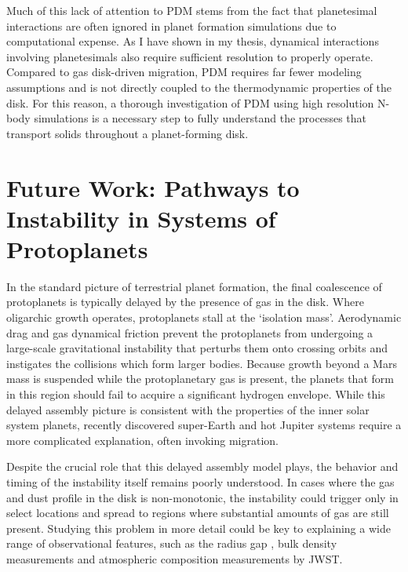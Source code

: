 Much of this lack of attention to PDM stems from the fact that planetesimal interactions are often ignored in planet formation simulations due to computational expense. As I have shown in my thesis, dynamical interactions involving planetesimals also require sufficient resolution to properly operate. Compared to gas disk-driven migration, PDM requires far fewer modeling assumptions and is not directly coupled to the thermodynamic properties of the disk. For this reason, a thorough investigation of PDM using high resolution N-body simulations is a necessary step to fully understand the processes that transport solids throughout a planet-forming disk.

\section{Future Work: Pathways to Instability in Systems of Protoplanets}

In the standard picture of terrestrial planet formation, the final coalescence of protoplanets is typically delayed by the presence of gas in the disk. Where oligarchic growth operates, protoplanets stall at the `isolation mass'. Aerodynamic drag and gas dynamical friction prevent the protoplanets from undergoing a large-scale gravitational instability that perturbs them onto crossing orbits and instigates the collisions which form larger bodies. Because growth beyond a Mars mass is suspended while the protoplanetary gas is present, the planets that form in this region should fail to acquire a significant hydrogen envelope. While this delayed assembly picture is consistent with the properties of the inner solar system planets, recently discovered super-Earth and hot Jupiter systems require a more complicated explanation, often invoking migration.

Despite the crucial role that this delayed assembly model plays, the behavior and timing of the instability itself remains poorly understood. In cases where the gas and dust profile in the disk is non-monotonic, the instability could trigger only in select locations and spread to regions where substantial amounts of gas are still present. Studying this problem in more detail could be key to explaining a wide range of observational features, such as the radius gap \cite{fulton17}, bulk density measurements \cite{lopez14, wolfgang15} and atmospheric composition measurements by JWST.

